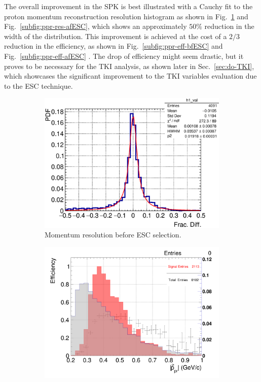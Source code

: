    The overall improvement in the SPK is best illustrated with a Cauchy fit to the proton momentum reconstruction resolution histogram as shown in Fig.~\ref{subfig:ppr-res-bfESC} and Fig.~\ref{subfig:ppr-res-afESC}, which shows an approximately $50\%$ reduction in the width of the distribution.
   This improvement is achieved at the cost of a $2/3$ reduction in the efficiency, as shown in Fig.~\ref{subfig:ppr-eff-bfESC} and Fig.~\ref{subfig:ppr-eff-afESC} .
   The drop of efficiency might seem drastic, but it proves to be necessary for the TKI analysis, as shown later in Sec.~\ref{sec:do-TKI}, which showcases the significant improvement to the TKI variables evaluation due to the ESC technique. 

   \begin{figure}[t]
      \centering
      \begin{subfigure}{\dbfigwid\textwidth}
           \includegraphics[width=\textwidth]{figures/sel/p_pr_res_pdf_al13_zoom.eps}
           \caption{Momentum resolution before ESC selection.}
           \label{subfig:ppr-res-bfESC}
      \end{subfigure}
      \begin{subfigure}{\dbfigwid\textwidth}
           \includegraphics[width=\textwidth]{figures/sel/p_pr_eff_al13.png}

\end{subfigure}
\end{figure}
